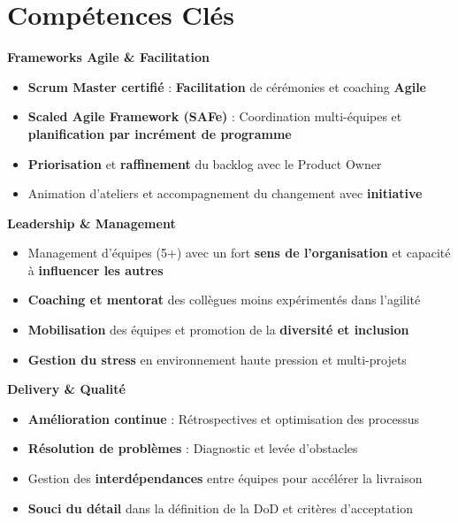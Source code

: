 \documentclass[11pt,a4paper]{article}
\newcommand{\highlight}[1]{\textcolor{primaryblue}{\textbf{#1}}}
\newcommand{\skilltitle}[1]{\normalsize\textcolor{primaryblue}{\textbf{#1}}}
\begin{document}
\section*{Compétences Clés}
\begin{minipage}[t]{0.55\textwidth}
\skilltitle{Frameworks Agile \& Facilitation}
\begin{itemize}[leftmargin=10pt]
    \item \highlight{Scrum Master certifié} : \highlight{Facilitation} de cérémonies et coaching \highlight{Agile}
    \item \highlight{Scaled Agile Framework (SAFe)} : Coordination multi-équipes et \highlight{planification par incrément de programme}
    \item \highlight{Priorisation} et \highlight{raffinement} du backlog avec le Product Owner
    \item Animation d'ateliers et accompagnement du changement avec \highlight{initiative}
\end{itemize}

\skilltitle{Leadership \& Management}
\begin{itemize}[leftmargin=10pt]
    \item Management d'équipes (5+) avec un fort \highlight{sens de l'organisation} et capacité à \highlight{influencer les autres}
    \item \highlight{Coaching et mentorat} des collègues moins expérimentés dans l'agilité
    \item \highlight{Mobilisation} des équipes et promotion de la \highlight{diversité et inclusion}
    \item \highlight{Gestion du stress} en environnement haute pression et multi-projets
\end{itemize}

\skilltitle{Delivery \& Qualité}
\begin{itemize}[leftmargin=10pt]
    \item \highlight{Amélioration continue} : Rétrospectives et optimisation des processus
    \item \highlight{Résolution de problèmes} : Diagnostic et levée d'obstacles
    \item Gestion des \highlight{interdépendances} entre équipes pour accélérer la livraison
    \item \highlight{Souci du détail} dans la définition de la DoD et critères d'acceptation
\end{itemize}

\end{minipage}
\end{document}
